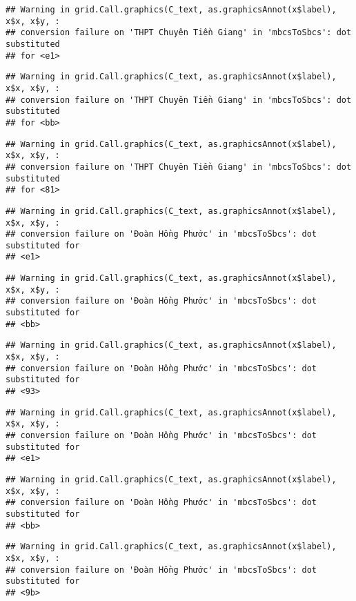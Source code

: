 \documentclass[
]{article}
\begin{document}
\begin{verbatim}
## Warning in grid.Call.graphics(C_text, as.graphicsAnnot(x$label), x$x, x$y, :
## conversion failure on 'THPT Chuyên Tiền Giang' in 'mbcsToSbcs': dot substituted
## for <e1>
\end{verbatim}

\begin{verbatim}
## Warning in grid.Call.graphics(C_text, as.graphicsAnnot(x$label), x$x, x$y, :
## conversion failure on 'THPT Chuyên Tiền Giang' in 'mbcsToSbcs': dot substituted
## for <bb>
\end{verbatim}

\begin{verbatim}
## Warning in grid.Call.graphics(C_text, as.graphicsAnnot(x$label), x$x, x$y, :
## conversion failure on 'THPT Chuyên Tiền Giang' in 'mbcsToSbcs': dot substituted
## for <81>
\end{verbatim}

\begin{verbatim}
## Warning in grid.Call.graphics(C_text, as.graphicsAnnot(x$label), x$x, x$y, :
## conversion failure on 'Đoàn Hồng Phước' in 'mbcsToSbcs': dot substituted for
## <e1>
\end{verbatim}

\begin{verbatim}
## Warning in grid.Call.graphics(C_text, as.graphicsAnnot(x$label), x$x, x$y, :
## conversion failure on 'Đoàn Hồng Phước' in 'mbcsToSbcs': dot substituted for
## <bb>
\end{verbatim}

\begin{verbatim}
## Warning in grid.Call.graphics(C_text, as.graphicsAnnot(x$label), x$x, x$y, :
## conversion failure on 'Đoàn Hồng Phước' in 'mbcsToSbcs': dot substituted for
## <93>
\end{verbatim}

\begin{verbatim}
## Warning in grid.Call.graphics(C_text, as.graphicsAnnot(x$label), x$x, x$y, :
## conversion failure on 'Đoàn Hồng Phước' in 'mbcsToSbcs': dot substituted for
## <e1>
\end{verbatim}

\begin{verbatim}
## Warning in grid.Call.graphics(C_text, as.graphicsAnnot(x$label), x$x, x$y, :
## conversion failure on 'Đoàn Hồng Phước' in 'mbcsToSbcs': dot substituted for
## <bb>
\end{verbatim}

\begin{verbatim}
## Warning in grid.Call.graphics(C_text, as.graphicsAnnot(x$label), x$x, x$y, :
## conversion failure on 'Đoàn Hồng Phước' in 'mbcsToSbcs': dot substituted for
## <9b>
\end{verbatim}
\end{document}
